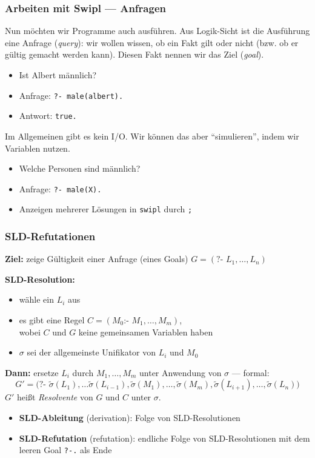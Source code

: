 \documentclass{beamer}
\begin{document}
\begin{frame} \frametitle{Arbeiten mit Swipl --- Anfragen}
	\footnotesize
	Nun möchten wir Programme auch ausführen. Aus Logik-Sicht ist die Ausführung eine Anfrage (\textit{query}): wir wollen wissen, ob ein Fakt gilt oder nicht (bzw. ob er gültig gemacht werden kann). Diesen Fakt nennen wir das Ziel (\textit{goal}).
	\begin{itemize}
		\item Ist Albert männlich?
		\item Anfrage: \texttt{?- male(albert).}
		\item Antwort: \texttt{true.}
	\end{itemize}
	
	Im Allgemeinen gibt es kein I/O. Wir können das aber \enquote{simulieren}, indem wir Variablen nutzen. 
	\begin{itemize}
		\item Welche Personen sind männlich?
		\item Anfrage: \texttt{?- male(X).}
		\item Anzeigen mehrerer Lösungen in \texttt{swipl} durch \texttt{;}
	\end{itemize}
\end{frame}

\begin{frame} \frametitle{SLD-Refutationen}
	\footnotesize
	\textbf{Ziel:} zeige Gültigkeit einer Anfrage (eines Goals) $G = (\texttt{?- } L_1, \dots, L_n)$
	
	\textbf{SLD-Resolution:}
	\begin{itemize}
		\item wähle ein $L_i$ aus
		\item es gibt eine Regel $C = (M_0 \texttt{:- }M_1, \dots, M_m)$,\\
		wobei $C$ und $G$ keine gemeinsamen Variablen haben
		\item $\sigma$ sei der allgemeinste Unifikator von $L_i$ und $M_0$
	\end{itemize}
	\textbf{Dann:} ersetze $L_i$ durch $M_1, \dots, M_m$ unter Anwendung von $\sigma$ --- formal: 
	\begin{equation*}
		G' = \Big( \texttt{?- } \tilde{\sigma}(L_1), \dots \tilde{\sigma}(L_{i-1}) ,  \tilde{\sigma}(M_1), \dots, \tilde{\sigma}(M_m), \tilde{\sigma}(L_{i+1}), \dots, \tilde{\sigma}(L_n) \Big)
	\end{equation*}
	$G'$ heißt \textit{Resolvente} von $G$ und $C$ unter $\sigma$.
	
	\begin{itemize}
		\item\textbf{SLD-Ableitung} (derivation): Folge von SLD-Resolutionen
		\item \textbf{SLD-Refutation} (refutation): endliche Folge von SLD-Resolutionen mit dem leeren Goal \texttt{?-.} als Ende
	\end{itemize}
\end{frame}
\end{document}
